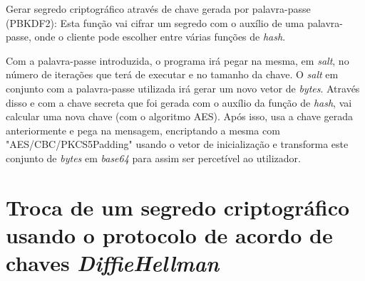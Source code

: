 Gerar segredo criptográfico através de chave gerada por palavra-passe \\ (PBKDF2): Esta função vai cifrar um segredo com o auxílio de uma palavra-passe, onde o cliente pode escolher entre várias funções de \emph{hash}. 

Com a palavra-passe introduzida, o programa irá pegar na mesma, em \codigo\textit{{salt}}, no número de iterações que terá de executar e no tamanho da chave. O \codigo\textit{{salt}} em conjunto com a palavra-passe utilizada irá gerar um novo vetor de \emph{bytes}. Através disso e com a chave secreta que foi gerada com o auxílio da função de \textit{hash}, vai calcular uma nova chave (com o algoritmo AES). Após isso, usa a chave gerada anteriormente e pega na mensagem, encriptando a mesma com "AES/CBC/PKCS5Padding" usando o vetor de inicialização e transforma este conjunto de \emph\textit{{bytes}} em \textit{base64} para assim ser percetível ao utilizador.

\newline\section{Troca de um segredo criptográfico usando o protocolo de acordo de chaves \textit{DiffieHellman}}
\label{chap4:sec:diffiehellman}

